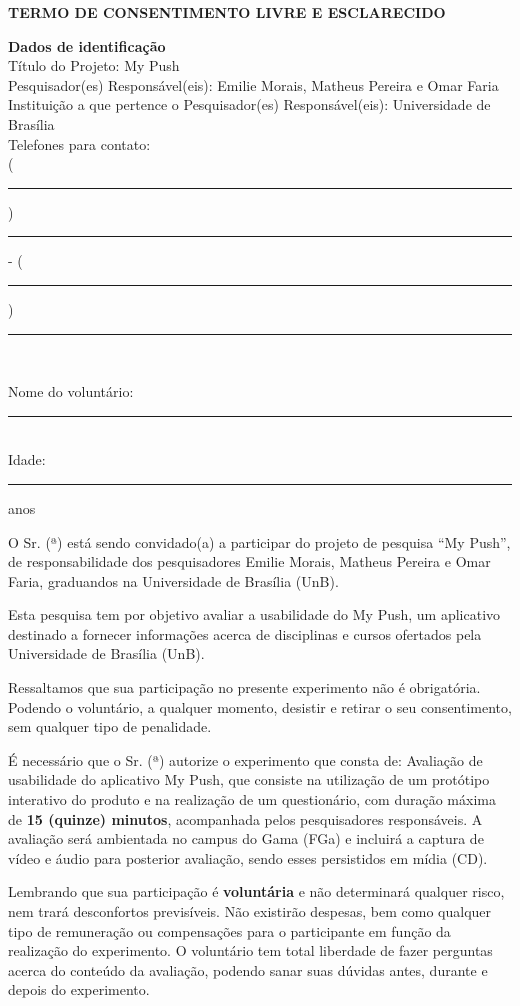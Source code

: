 \textbf{TERMO DE CONSENTIMENTO LIVRE E ESCLARECIDO}
\vspace{1cm}

{\raggedright
\textbf{Dados de identificação}\\
Título do Projeto: My Push\\
Pesquisador(es) Responsável(eis): Emilie Morais, Matheus Pereira e Omar Faria\\
Instituição a que pertence o Pesquisador(es) Responsável(eis): Universidade de Brasília\\
Telefones para contato:\\
(\rule{1cm}{0.5pt})\rule{5cm}{0.5pt} - (\rule{1cm}{0.5pt})\rule{5cm}{0.5pt}\\

\vspace{1cm}

Nome do voluntário:\rule{12cm}{0.5pt}\\
Idade:\rule{1cm}{0.5pt} anos
}
 
\vspace{0.5cm}
O Sr. (ª) está sendo convidado(a) a participar do projeto de pesquisa “My Push”, de responsabilidade dos pesquisadores Emilie Morais, Matheus Pereira e Omar Faria, graduandos na Universidade de Brasília (UnB).

Esta pesquisa tem por objetivo avaliar a usabilidade do My Push, um aplicativo destinado a fornecer informações acerca de disciplinas e cursos ofertados pela Universidade de Brasília (UnB).

Ressaltamos que sua participação no presente experimento não é obrigatória. Podendo o voluntário, a qualquer momento, desistir e retirar o seu consentimento, sem qualquer tipo de penalidade.

É necessário que o Sr. (ª) autorize o experimento que consta de: Avaliação de usabilidade do aplicativo My Push, que consiste na utilização de um protótipo interativo do produto e na realização de um questionário,
com duração máxima de \textbf{15 (quinze) minutos}, acompanhada pelos pesquisadores responsáveis. A avaliação será ambientada no campus do Gama (FGa) e incluirá a captura de vídeo e áudio para posterior avaliação, sendo esses
persistidos em mídia (CD).

Lembrando que sua participação é \textbf{voluntária} e não determinará qualquer risco, nem trará desconfortos previsíveis. Não existirão despesas, bem como qualquer tipo de remuneração ou compensações para o participante em função da 
realização do experimento. O voluntário tem total liberdade de fazer perguntas acerca do conteúdo da avaliação, podendo sanar suas dúvidas antes, durante e depois do experimento.

